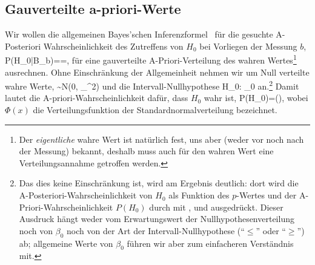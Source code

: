 \subsection{Gau\3verteilte a-priori-Werte}

Wir wollen die allgemeinen Bayes'schen
Inferenzformel~ f\"ur die gesuchte
A-Pos\-te\-ri\-ori Wahr\-schein\-lich\-keit des Zutreffens von $H_0$ bei
Vorliegen der Messung $b$,
\be
P(H_0|B_b)==,
\ee
f\"ur eine gau\3verteilte A-Priori-Verteilung des wahren
Wertes\footnote{Der \emph{eigentliche} wahre Wert ist nat\"urlich
  fest, uns aber (weder vor noch nach der Messung) bekannt, deshalb
  muss auch f\"ur den wahren Wert eine Verteilungsannahme getroffen
  werden.} ausrechnen.  Ohne Einschr\"ankung der Allgemeinheit nehmen
wir um Null verteilte wahre Werte,
\bdm
\beta \sim N(0, \sigma_{\beta}^2)
\edm
und die Intervall-Nullhypothese 
\bdm
H_0: \quad \beta \le \beta_0
\edm
an.\footnote{Das dies keine Einschr\"ankung ist, wird am Ergebnis
  deutlich: dort wird die 
  A-Posteriori-Wahrscheinlichkeit von $H_0$ als Funktion des $p$-Wertes und der
  A-Priori-Wahrscheinlichkeit $P(H_0)$ durch  mit
  ,  und  ausgedr\"uckt.
  Dieser Ausdruck h\"angt weder vom Erwartungswert der
  Nullhypothesenverteilung noch von $\beta_0$ noch von der Art der
  Intervall-Nullhypothese (``$\le$'' oder ``$\ge$'') ab; allgemeine
  Werte von $\beta_0$ f\"uhren wir aber zum einfacheren Verst\"andnis
  mit.}
Damit lautet die A-priori-Wahr\-schein\-lich\-keit daf\"ur, dass $H_0$ 
wahr ist,
\be
\label{PH0}
P(H_0)=\Phi \left(\right),
\ee
wobei $\Phi(x)$ die Verteilungsfunktion der Standardnormalverteilung
bezeichnet.

